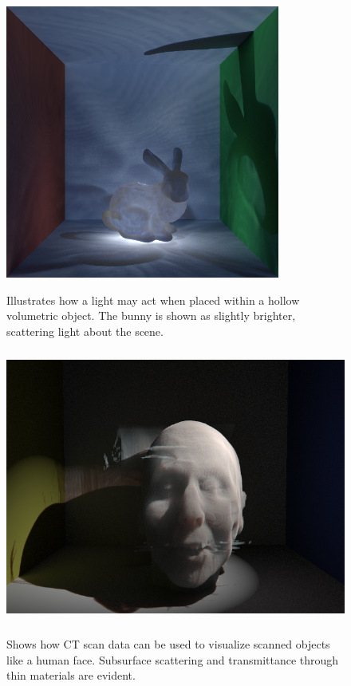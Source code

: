 \documentclass[12pt]{ucthesis}
\newcommand{\captionfonts}{\small\bf\ssp}
\begin{document}
\begin{figure}[h!]
    \centering
    \includegraphics[height=90mm]{img/bunny_glow.png}
    \captionfonts
    \caption{Illustrates how a light may act when placed within a hollow volumetric object.  The bunny is shown as slightly brighter, scattering light about the scene.}
\end{figure}

\begin{figure}[h!]
    \centering
    \includegraphics[height=90mm]{img/face1.png}
    \captionfonts
    \caption{Shows how CT scan data can be used to visualize scanned objects like a human face.  Subsurface scattering and transmittance through thin materials are evident.}
\end{figure}
\end{document}
